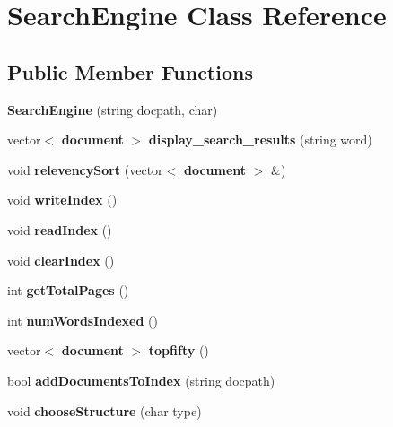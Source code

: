 \section{Search\+Engine Class Reference}
\label{class_search_engine}
\subsection*{Public Member Functions}
\begin{DoxyCompactItemize}
\item 
{\bfseries Search\+Engine} (string docpath, char)\label{class_search_engine_a96042d7c914e9dec875f9f34efd42746}

\item 
vector$<$ {\bf document} $>$ {\bfseries display\+\_\+search\+\_\+results} (string word)\label{class_search_engine_a28b5caaf6c40264037ffab938c0a6916}

\item 
void {\bfseries relevency\+Sort} (vector$<$ {\bf document} $>$ \&)\label{class_search_engine_abf44270499162aeb6b78ad9f72c89825}

\item 
void {\bfseries write\+Index} ()\label{class_search_engine_ad480df2432da22ce6556ada835112a4b}

\item 
void {\bfseries read\+Index} ()\label{class_search_engine_aefc6f13183bc05854205ca0dd1f2e22e}

\item 
void {\bfseries clear\+Index} ()\label{class_search_engine_a543e75d77f79c981b0c85bf3e6c4aa32}

\item 
int {\bfseries get\+Total\+Pages} ()\label{class_search_engine_a213e139ff06e4a786eb0d4291ab36b3a}

\item 
int {\bfseries num\+Words\+Indexed} ()\label{class_search_engine_aec2f16d453e857875e62777117b173a3}

\item 
vector$<$ {\bf document} $>$ {\bfseries topfifty} ()\label{class_search_engine_a6e4fb46ec3e35b4fcd3e479b21398983}

\item 
bool {\bfseries add\+Documents\+To\+Index} (string docpath)\label{class_search_engine_ac34ccd88ddb26e15843036a63f80ca22}

\item 
void {\bfseries choose\+Structure} (char type)\label{class_search_engine_ab1b68eb5a1887426b044f041546cbbb2}


\end{DoxyCompactItemize}
